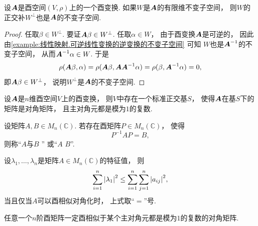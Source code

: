 \begin{proposition}
设\(\boldsymbol{A}\)是酉空间\((V,\rho)\)上的一个酉变换.
如果\(W\)是\(\boldsymbol{A}\)的有限维不变子空间，
则\(W\)的正交补\(W^\perp\)也是\(\boldsymbol{A}\)的不变子空间.
\begin{proof}
任取\(\beta \in W^\perp\).
要证\(\boldsymbol{A}\beta \in W^\perp\).
任取\(\alpha \in W\)，
由于酉变换\(\boldsymbol{A}\)是可逆的，
因此由\cref{example:线性映射.可逆线性变换的逆变换的不变子空间} 可知
\(W\)也是\(\boldsymbol{A}^{-1}\)的不变子空间，
从而\(\boldsymbol{A}^{-1}\alpha \in W\).
于是\begin{equation*}
	\rho(\boldsymbol{A}\beta,\alpha)
	= \rho(\boldsymbol{A}\beta,\boldsymbol{A}\boldsymbol{A}^{-1}\alpha)
	= \rho(\beta,\boldsymbol{A}^{-1}\alpha)
	= 0,
\end{equation*}
即\(\boldsymbol{A}\beta \in W^\perp\)，
说明\(W^\perp\)是\(\boldsymbol{A}\)的不变子空间.
\end{proof}
\end{proposition}

\begin{theorem}
设\(\boldsymbol{A}\)是\(n\)维酉空间\(V\)上的酉变换，
则\(V\)中存在一个标准正交基\(S\)，
使得\(\boldsymbol{A}\)在基\(S\)下的矩阵是对角矩阵，
且主对角元都是模为\(1\)的复数.
\end{theorem}

\begin{definition}
设矩阵\(A,B \in M_n(\mathbb{C})\).
若存在酉矩阵\(P \in M_n(\mathbb{C})\)，
使得\begin{equation}
	P^{-1} A P = B,
\end{equation}
则称“\(A\)与\(B\) ”
或“\(A\)  \(B\)”.
\end{definition}


\begin{theorem}%
设\(\lambda_1,\dotsc,\lambda_n\)是矩阵\(A \in M_n(\mathbb{C})\)的特征值，
则\begin{equation*}
	\sum_{i=1}^n \abs{ \lambda_1 }^2
	\leq \sum_{i=1}^n \sum_{j=1}^n \abs{ a_{ij} }^2,
\end{equation*}
当且仅当\(A\)可以酉相似对角化时，
上式取“\(=\)”号.
\end{theorem}

\begin{corollary}
任意一个\(n\)阶酉矩阵一定酉相似于某个主对角元都是模为\(1\)的复数的对角矩阵.
\end{corollary}

